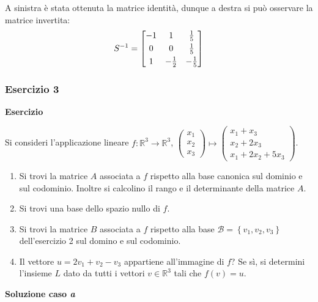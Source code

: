 \documentclass[a4paper]{article}
\makeatletter
\newenvironment{rowequmatbra}[1]{\left[\array{@{}#1@{}}}{\endarray\right]}
\makeatother
\begin{document}
	A sinistra è stata ottenuta la matrice identità, dunque a destra si può osservare la matrice invertita:
	\begin{equation*}
		S^{-1} = \begin{rowequmatbra}{ccc}
			-1 & 1 & \frac{1}{5} \\ [0.3em]
			0 & 0 & \frac{1}{5} \\ [0.3em]
			 1 & -\frac{1}{2} & -\frac{1}{5}
		\end{rowequmatbra}
	\end{equation*}\newpage
	
	\subsubsection{Esercizio 3}
	
	\textcolor{Red3}{\textbf{Esercizio}}\newline
	
	\noindent
	Si consideri l'applicazione lineare $f:\mathbb{R}^{3} \rightarrow \mathbb{R}^{3}$, $
	\begin{pmatrix}
		x_{1} \\
		x_{2} \\
		x_{3}
	\end{pmatrix}
	\mapsto
	\begin{pmatrix}
		x_{1} + x_{3} 	\\
		x_{2} + 2x_{3} 	\\
		x_{1} + 2x_{2} + 5x_{3}
	\end{pmatrix}$.
	\begin{enumerate}[label=(\alph*)]
		\item Si trovi la matrice $A$ associata a $f$ rispetto alla base canonica sul dominio e sul codominio. Inoltre si calcolino il rango e il determinante della matrice $A$.
		
		\item Si trovi una base dello spazio nullo di $f$.
		
		\item Si trovi la matrice $B$ associata a $f$ rispetto alla base $\mathcal{B} = \left\{v_{1}, v_{2}, v_{3}\right\}$ dell'esercizio 2 sul domino e sul codominio.
		
		\item Il vettore $u = 2v_{1} + v_{2} - v_{3}$ appartiene all'immagine di $f$? Se sì, si determini l'insieme $L$ dato da tutti i vettori $v \in \mathbb{R}^{3}$ tali che $f\left(v\right) = u$.
	\end{enumerate}
	
	\noindent
	\textcolor{Green4}{\textbf{Soluzione caso \emph{a}}}\newline
	
\end{document}

